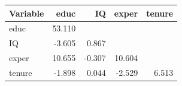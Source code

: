 
\begin{tabular}{lrrrr}
\toprule
Variable & educ & IQ & exper & tenure\\
\midrule
educ & 53.110 &  &  & \\
IQ & -3.605 & 0.867 &  & \\
exper & 10.655 & -0.307 & 10.604 & \\
tenure & -1.898 & 0.044 & -2.529 & 6.513\\
\bottomrule
\end{tabular}

